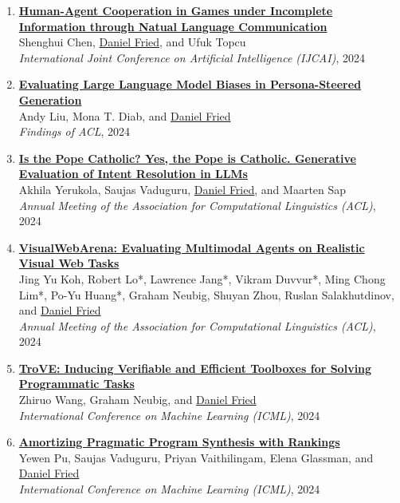 \begin{enumerate}[leftmargin=-1mm,partopsep=0pt]
\item \href{https://arxiv.org/abs/2405.14173}{\textbf{Human-Agent Cooperation in Games under Incomplete Information through Natual Language Communication }} \\
  Shenghui Chen, \underline{Daniel Fried}, and Ufuk Topcu\\
  \emph{International Joint Conference on Artificial Intelligence (IJCAI)}, 2024

\item \href{https://arxiv.org/abs/2405.20253}{\textbf{Evaluating Large Language Model Biases in Persona-Steered Generation}} \\
  Andy Liu, Mona T. Diab, and \underline{Daniel Fried}\\
  \emph{Findings of ACL}, 2024

\item \href{https://arxiv.org/abs/2405.08760}{\textbf{Is the Pope Catholic? Yes, the Pope is Catholic. Generative Evaluation of Intent Resolution in LLMs}} \\
  Akhila Yerukola, Saujas Vaduguru, \underline{Daniel Fried}, and Maarten Sap\\
  \emph{Annual Meeting of the Association for Computational Linguistics (ACL)}, 2024

\item \href{https://arxiv.org/abs/2401.13649}{\textbf{VisualWebArena: Evaluating Multimodal Agents on Realistic Visual Web Tasks}} \\
  Jing Yu Koh, Robert Lo*, Lawrence Jang*, Vikram Duvvur*, Ming Chong Lim*, Po-Yu Huang*, Graham Neubig, Shuyan Zhou, Ruslan Salakhutdinov, and \underline{Daniel Fried}\\
  \emph{Annual Meeting of the Association for Computational Linguistics (ACL)}, 2024

\item \href{https://arxiv.org/abs/2401.12869}{\textbf{TroVE: Inducing Verifiable and Efficient Toolboxes for Solving Programmatic Tasks}} \\
  Zhiruo Wang, Graham Neubig, and \underline{Daniel Fried}\\
  \emph{International Conference on Machine Learning (ICML)}, 2024

\item \href{https://arxiv.org/abs/2407.02499}{\textbf{Amortizing Pragmatic Program Synthesis with Rankings}} \\
  Yewen Pu, Saujas Vaduguru, Priyan Vaithilingam, Elena Glassman, and \underline{Daniel Fried}\\
  \emph{International Conference on Machine Learning (ICML)}, 2024


\end{enumerate}
